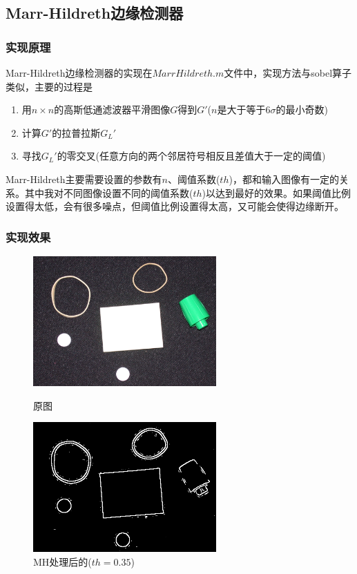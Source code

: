 \documentclass[11pt, a4paper, UTF8]{ctexart}
\begin{document}
\subsection{Marr-Hildreth边缘检测器}

\subsubsection{实现原理}
Marr-Hildreth边缘检测器的实现在$MarrHildreth.m$文件中，实现方法与sobel算子类似，主要的过程是
 \begin{enumerate}
   \item 用$n \times n$的高斯低通滤波器平滑图像$G$得到$G'$($n$是大于等于$6\sigma$的最小奇数)
   \item 计算$G'$的拉普拉斯$G_L'$
   \item 寻找$G_L'$的零交叉(任意方向的两个邻居符号相反且差值大于一定的阈值)
 \end{enumerate}
Marr-Hildreth主要需要设置的参数有$n$、阈值系数($th$)，都和输入图像有一定的关系。其中我对不同图像设置不同的阈值系数($th$)以达到最好的效果。如果阈值比例设置得太低，会有很多噪点，但阈值比例设置得太高，又可能会使得边缘断开。

\subsubsection{实现效果}

\begin{figure}[H]
  \centering
  \begin{minipage}[t]{0.48\textwidth}
  \centering
  \includegraphics[width=7cm]{rubberband_cap.png}
  \caption{原图}
  \end{minipage}
  \begin{minipage}[t]{0.48\textwidth}
  \centering
  \includegraphics[width=7cm]{MH_alpha=0.35_rubberband_cap.png}
  \caption{MH处理后的($th=0.35$)}
  \end{minipage}
\end{figure}
\end{document}
